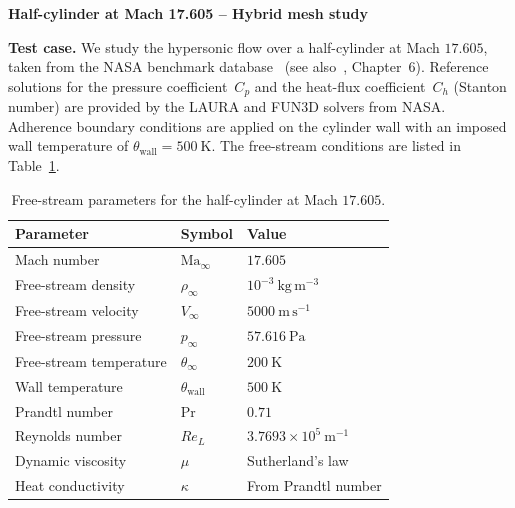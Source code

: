 \documentclass[a4paper]{article}
\begin{document}
\begin{center}
  {\LARGE\bfseries Half-cylinder at Mach 17.605 -- Hybrid mesh study}
\end{center}

\bigskip

\noindent
\textbf{Test case.}
We study the hypersonic flow over a half-cylinder at Mach $17.605$, taken from the NASA
benchmark database~\cite{FUN3D} (see also~\cite{Delmas2026}, Chapter~6).  Reference solutions for the pressure coefficient~$C_p$
and the heat-flux coefficient~$C_h$ (Stanton number) are provided by the LAURA and FUN3D
solvers from NASA.  Adherence boundary conditions are applied on the cylinder wall with an
imposed wall temperature of $\theta_\mathrm{wall} = 500~\mathrm{K}$.
The free-stream conditions are listed in Table~\ref{tab:params}.

\bigskip

\begin{table}[h!]
  \centering
  \caption{Free-stream parameters for the half-cylinder at Mach $17.605$.}
  \label{tab:params}
  \renewcommand{\arraystretch}{1.3}
  \begin{tabular}{lll}
    \toprule
    Parameter & Symbol & Value \\
    \midrule
    Mach number           & $\mathrm{Ma}_\infty$    & $17.605$ \\
    Free-stream density   & $\rho_\infty$           & $10^{-3}~\mathrm{kg\,m^{-3}}$ \\
    Free-stream velocity  & $V_\infty$              & $5000~\mathrm{m\,s^{-1}}$ \\
    Free-stream pressure  & $p_\infty$              & $57.616~\mathrm{Pa}$ \\
    Free-stream temperature & $\theta_\infty$       & $200~\mathrm{K}$ \\
    Wall temperature      & $\theta_\mathrm{wall}$  & $500~\mathrm{K}$ \\
    Prandtl number        & $\mathrm{Pr}$           & $0.71$ \\
    Reynolds number       & $Re_L$                  & $3.7693\times10^5~\mathrm{m^{-1}}$ \\
    Dynamic viscosity     & $\mu$                   & Sutherland's law \\
    Heat conductivity     & $\kappa$                & From Prandtl number \\
    \bottomrule
  \end{tabular}
\end{table}
\end{document}
